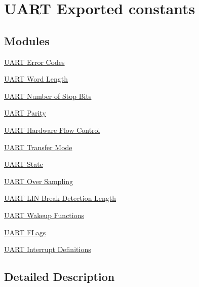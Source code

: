\hypertarget{group___u_a_r_t___exported___constants}{\section{U\-A\-R\-T Exported constants}
\label{group___u_a_r_t___exported___constants}
}
\subsection*{Modules}
\begin{DoxyCompactItemize}
\item 
\hyperlink{group___u_a_r_t___error___codes}{U\-A\-R\-T Error Codes}
\item 
\hyperlink{group___u_a_r_t___word___length}{U\-A\-R\-T Word Length}
\item 
\hyperlink{group___u_a_r_t___stop___bits}{U\-A\-R\-T Number of Stop Bits}
\item 
\hyperlink{group___u_a_r_t___parity}{U\-A\-R\-T Parity}
\item 
\hyperlink{group___u_a_r_t___hardware___flow___control}{U\-A\-R\-T Hardware Flow Control}
\item 
\hyperlink{group___u_a_r_t___mode}{U\-A\-R\-T Transfer Mode}
\item 
\hyperlink{group___u_a_r_t___state}{U\-A\-R\-T State}
\item 
\hyperlink{group___u_a_r_t___over___sampling}{U\-A\-R\-T Over Sampling}
\item 
\hyperlink{group___u_a_r_t___l_i_n___break___detection___length}{U\-A\-R\-T L\-I\-N Break Detection Length}
\item 
\hyperlink{group___u_a_r_t___wake_up__functions}{U\-A\-R\-T Wakeup Functions}
\item 
\hyperlink{group___u_a_r_t___flags}{U\-A\-R\-T F\-Lags}
\item 
\hyperlink{group___u_a_r_t___interrupt__definition}{U\-A\-R\-T Interrupt Definitions}
\end{DoxyCompactItemize}


\subsection{Detailed Description}
